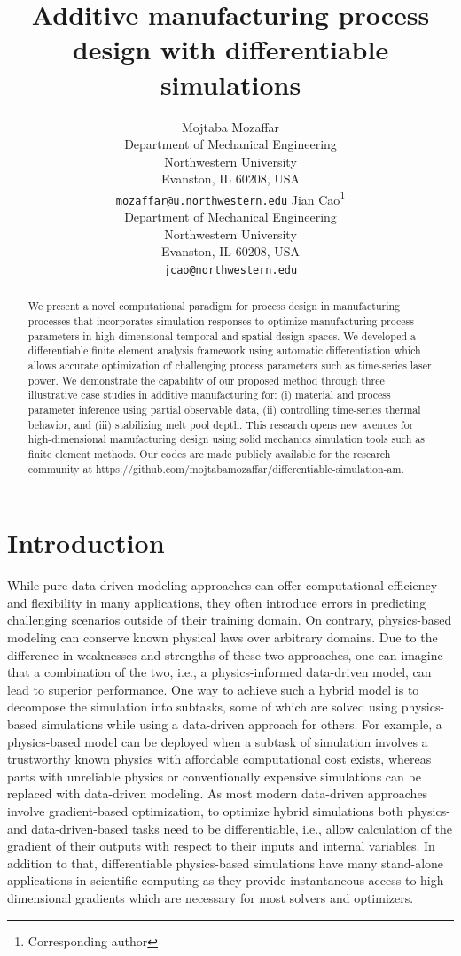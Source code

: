 \documentclass{article}
\title{Additive manufacturing process design with differentiable simulations}
\author{ \hspace{1mm}Mojtaba Mozaffar \\
	Department of Mechanical Engineering\\
	Northwestern University\\
	Evanston, IL 60208, USA \\
	\texttt{mozaffar@u.northwestern.edu}
	\And
	\hspace{1mm}Jian Cao\thanks{Corresponding author} \\
	Department of Mechanical Engineering\\
	Northwestern University\\
	Evanston, IL 60208, USA \\
	\texttt{jcao@northwestern.edu}
}
\begin{document}
\maketitle

\begin{abstract}
We present a novel computational paradigm for process design in manufacturing processes that incorporates simulation responses to optimize manufacturing process parameters in high-dimensional temporal and spatial design spaces. We developed a differentiable finite element analysis framework using automatic differentiation which allows accurate optimization of challenging process parameters such as time-series laser power. We demonstrate the capability of our proposed method through three illustrative case studies in additive manufacturing for: (i) material and process parameter inference using partial observable data, (ii) controlling time-series thermal behavior, and (iii) stabilizing melt pool depth. This research opens new avenues for high-dimensional manufacturing design using solid mechanics simulation tools such as finite element methods. Our codes are made publicly available for the research community at https://github.com/mojtabamozaffar/differentiable-simulation-am.
\end{abstract}




\section{Introduction}

While pure data-driven modeling approaches can offer computational efficiency and flexibility in many applications, they often introduce errors in predicting challenging scenarios outside of their training domain. On contrary, physics-based modeling can conserve known physical laws over arbitrary domains. Due to the difference in weaknesses and strengths of these two approaches, one can imagine that a combination of the two, i.e., a physics-informed data-driven model, can lead to superior performance. One way to achieve such a hybrid model is to decompose the simulation into subtasks, some of which are solved using physics-based simulations while using a data-driven approach for others. For example, a physics-based model can be deployed when a subtask of simulation involves a trustworthy known physics with affordable computational cost exists, whereas parts with unreliable physics or conventionally expensive simulations can be replaced with data-driven modeling. As most modern data-driven approaches involve gradient-based optimization, to optimize hybrid simulations both physics- and data-driven-based tasks need to be differentiable, i.e., allow calculation of the gradient of their outputs with respect to their inputs and internal variables. In addition to that, differentiable physics-based simulations have many stand-alone applications in scientific computing as they provide instantaneous access to high-dimensional gradients which are necessary for most solvers and optimizers.
\end{document}
